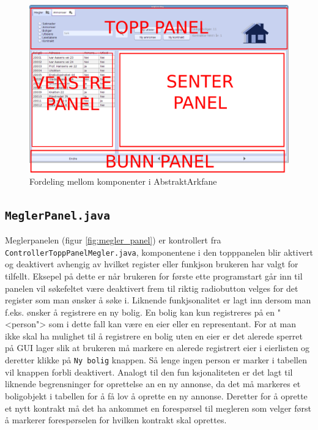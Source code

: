 \begin{figure}[ht]
 \includegraphics[width=\textwidth,height=\textheight,keepaspectratio]{./img/produktdokumentasjon/swing_componenter/AbstraktArkfane.png}
 \caption{Fordeling mellom komponenter i AbstraktArkfane}
 \label{fig:asbtarkfane}
\end{figure}



\subsection{\texttt{MeglerPanel.java}}
Meglerpanelen (figur \ref{fig:megler_panel}) er kontrollert fra \texttt{ControllerToppPanelMegler.java}, komponentene i den topppanelen blir aktivert og deaktivert avhengig av hvilket register eller funkjson brukeren har valgt for tilfellt. Eksepel på dette er når brukeren for første ette programstart går inn til panelen vil søkefeltet være deaktivert frem til riktig radiobutton velges for det register som man ønsker å søke i. Liknende funkjsonalitet er lagt inn dersom man f.eks. ønsker å registrere en ny bolig. En bolig kan kun registreres på en "<person"> som i dette fall kan være en eier eller en representant. For at man ikke skal ha mulighet til å registrere en bolig uten en eier er det alerede sperret på GUI lager slik at brukeren må markere en alerede registrert eier i eierlisten og deretter klikke på \texttt{Ny bolig} knappen. Så lenge ingen person er marker i tabellen vil knappen forbli deaktivert. Analogt til den fun ksjonaliteten er det lagt til liknende begrensninger for oprettelse an en ny annonse, da det må markeres et boligobjekt i tabellen for å få lov å oprette en ny annonse. Deretter for å oprette et nytt kontrakt må det ha ankommet en forespørsel til megleren som velger først å markerer forespørselen for hvilken kontrakt skal oprettes. 

